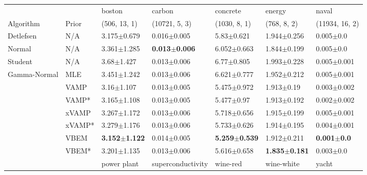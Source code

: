 \begin{tabular}{lllllll}
\toprule
             &       &                    boston &                    carbon &                  concrete &                    energy &                   naval \\
Algorithm & Prior& (506, 13, 1)& (10721, 5, 3)& (1030, 8, 1)& (768, 8, 2)& (11934, 16, 2)\\
\midrule
Detlefsen & N/A &           3.175$\pm$0.679 &           0.016$\pm$0.005 &            5.83$\pm$0.621 &           1.944$\pm$0.256 &           0.005$\pm$0.0 \\
Normal & N/A &           3.361$\pm$1.285 &  \textbf{0.013$\pm$0.006} &           6.052$\pm$0.663 &           1.844$\pm$0.199 &           0.005$\pm$0.0 \\
Student & N/A &            3.68$\pm$1.427 &           0.013$\pm$0.006 &            6.77$\pm$0.805 &           1.993$\pm$0.228 &         0.005$\pm$0.001 \\
Gamma-Normal & MLE &           3.451$\pm$1.242 &           0.013$\pm$0.006 &           6.621$\pm$0.777 &           1.952$\pm$0.212 &         0.005$\pm$0.001 \\
             & VAMP &            3.16$\pm$1.107 &           0.013$\pm$0.005 &           5.475$\pm$0.972 &            1.913$\pm$0.19 &         0.003$\pm$0.002 \\
             & VAMP* &           3.165$\pm$1.108 &           0.013$\pm$0.005 &            5.477$\pm$0.97 &           1.913$\pm$0.192 &         0.002$\pm$0.002 \\
             & xVAMP &           3.267$\pm$1.172 &           0.013$\pm$0.006 &           5.718$\pm$0.656 &           1.915$\pm$0.199 &         0.005$\pm$0.001 \\
             & xVAMP* &           3.279$\pm$1.176 &           0.013$\pm$0.006 &           5.733$\pm$0.626 &           1.914$\pm$0.195 &         0.004$\pm$0.001 \\
             & VBEM &  \textbf{3.152$\pm$1.122} &           0.014$\pm$0.005 &  \textbf{5.259$\pm$0.539} &           1.912$\pm$0.211 &  \textbf{0.001$\pm$0.0} \\
             & VBEM* &           3.201$\pm$1.135 &           0.013$\pm$0.006 &           5.616$\pm$0.658 &  \textbf{1.835$\pm$0.181} &           0.003$\pm$0.0 \\
\midrule
             &       &             power plant &          superconductivity &                 wine-red &                wine-white &                     yacht \\

\end{tabular}
